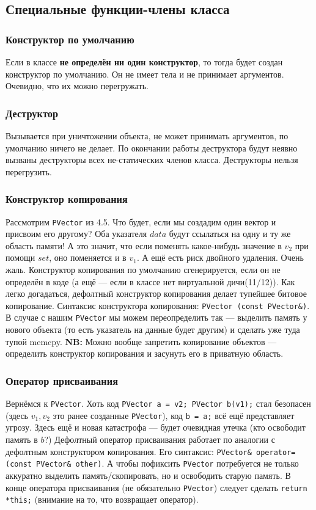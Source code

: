 \documentclass[15pt, a4paper]{article}
\newcommand{\nl}{\newline}
\begin{document}
  \subsection{Специальные функции-члены класса}
  \subsubsection{Конструктор по умолчанию}
  Если в классе \textbf{не определён ни один конструктор}, то тогда будет создан конструктор по умолчанию. Он не имеет тела и не принимает аргументов. Очевидно, что их можно перегружать.
  \subsubsection{Деструктор}
  Вызывается при уничтожении объекта, не может принимать аргументов, по умолчанию ничего не делает.
  По окончании работы деструктора будут неявно вызваны деструкторы всех не-статических членов класса. Деструкторы нельзя перегрузить.
  \subsubsection{Конструктор копирования}
  Рассмотрим \texttt{PVector} из 4.5. Что будет, если мы создадим один вектор и присвоим его другому? Оба указателя $data$ будут ссылаться на одну и ту же область памяти!
  А это значит, что если поменять какое-нибудь значение в $v_2$ при помощи $set$, оно поменяется и в $v_1$. А ещё есть риск двойного удаления. Очень жаль. \nl
  Конструктор копирования по умолчанию сгенерируется, если он не определён в коде (а ещё --- если в классе нет виртуальной дичи(11/12)).
  Как легко догадаться, дефолтный конструктор копирования делает тупейшее битовое копирование.
  Синтаксис конструктора копирования: \texttt{PVector (const PVector\&)}. В случае с нашим \texttt{PVector} мы можем переопределить так --- 
  выделить память у нового объекта (то есть указатель на данные будет другим) и сделать уже туда тупой memcpy. \nl
  \textbf{NB:} Можно вообще запретить копирование объектов --- определить конструктор копирования и засунуть его в приватную область. \newpage
  \subsubsection{Оператор присваивания}
  Вернёмся к \texttt{PVector}. Хоть код \texttt{PVector a = v2; PVector b(v1);} стал безопасен (здесь $v_1, v_2$ это ранее созданные \texttt{PVector}), 
  код \texttt{b = a;} всё ещё представляет угрозу. Здесь ещё и новая катастрофа --- будет очевидная утечка (кто освободит память в $b$?)
  Дефолтный оператор присваивания работает по аналогии с дефолтным конструктором копирования. Его синтаксис:
  \texttt{PVector\& operator=(const PVector\& other)}. А чтобы пофиксить \texttt{PVector} потребуется не только аккуратно выделить память/скопировать, но и освободить старую память. В конце оператора присваивания
  (не обязательно \texttt{PVector}) следует сделать \texttt{return *this;} (внимание на то, что возвращает оператор).
\end{document}
